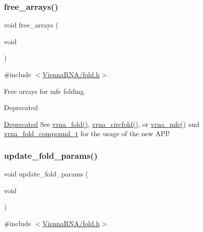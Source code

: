 \subsubsection{\texorpdfstring{free\+\_\+arrays()}{free\_arrays()}}
{\footnotesize\ttfamily void free\+\_\+arrays (\begin{DoxyParamCaption}\item[{void}]{ }\end{DoxyParamCaption})}



{\ttfamily \#include $<$\hyperlink{fold_8h}{Vienna\+R\+N\+A/fold.\+h}$>$}



Free arrays for mfe folding. 

\begin{DoxyRefDesc}{Deprecated}
\item[\hyperlink{deprecated__deprecated000071}{Deprecated}]See \hyperlink{group__mfe__fold__single_ga29a33b2895f4e67b0480271ff289afdc}{vrna\+\_\+fold()}, \hyperlink{group__mfe__fold__single_gaf973483d8acbc8cc9aacfc8a9b7f0074}{vrna\+\_\+circfold()}, or \hyperlink{group__mfe__fold_gabd3b147371ccf25c577f88bbbaf159fd}{vrna\+\_\+mfe()} and \hyperlink{group__fold__compound_ga1b0cef17fd40466cef5968eaeeff6166}{vrna\+\_\+fold\+\_\+compound\+\_\+t} for the usage of the new A\+P\+I!\end{DoxyRefDesc}
\mbox{\label{group__mfe__fold__single_ga41bf8f6fa15b94471f7095cad9f0ccf3}} 
\subsubsection{\texorpdfstring{update\+\_\+fold\+\_\+params()}{update\_fold\_params()}}
{\footnotesize\ttfamily void update\+\_\+fold\+\_\+params (\begin{DoxyParamCaption}\item[{void}]{ }\end{DoxyParamCaption})}



{\ttfamily \#include $<$\hyperlink{fold_8h}{Vienna\+R\+N\+A/fold.\+h}$>$}



